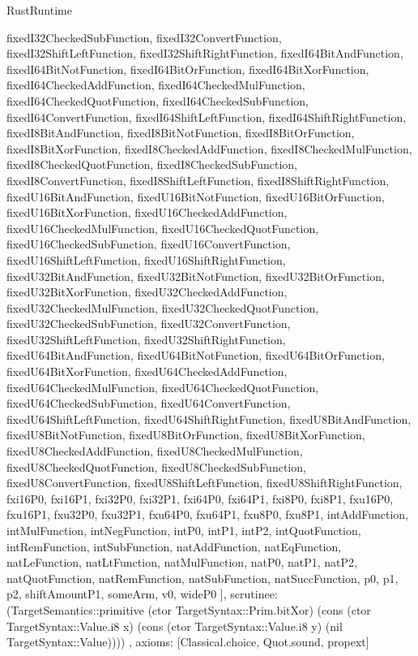 \begin{lexlean}{RustRuntime}
\begin{semanticmodule}
{{      fixedI32CheckedSubFunction,
      fixedI32ConvertFunction,
      fixedI32ShiftLeftFunction,
      fixedI32ShiftRightFunction,
      fixedI64BitAndFunction,
      fixedI64BitNotFunction,
      fixedI64BitOrFunction,
      fixedI64BitXorFunction,
      fixedI64CheckedAddFunction,
      fixedI64CheckedMulFunction,
      fixedI64CheckedQuotFunction,
      fixedI64CheckedSubFunction,
      fixedI64ConvertFunction,
      fixedI64ShiftLeftFunction,
      fixedI64ShiftRightFunction,
      fixedI8BitAndFunction,
      fixedI8BitNotFunction,
      fixedI8BitOrFunction,
      fixedI8BitXorFunction,
      fixedI8CheckedAddFunction,
      fixedI8CheckedMulFunction,
      fixedI8CheckedQuotFunction,
      fixedI8CheckedSubFunction,
      fixedI8ConvertFunction,
      fixedI8ShiftLeftFunction,
      fixedI8ShiftRightFunction,
      fixedU16BitAndFunction,
      fixedU16BitNotFunction,
      fixedU16BitOrFunction,
      fixedU16BitXorFunction,
      fixedU16CheckedAddFunction,
      fixedU16CheckedMulFunction,
      fixedU16CheckedQuotFunction,
      fixedU16CheckedSubFunction,
      fixedU16ConvertFunction,
      fixedU16ShiftLeftFunction,
      fixedU16ShiftRightFunction,
      fixedU32BitAndFunction,
      fixedU32BitNotFunction,
      fixedU32BitOrFunction,
      fixedU32BitXorFunction,
      fixedU32CheckedAddFunction,
      fixedU32CheckedMulFunction,
      fixedU32CheckedQuotFunction,
      fixedU32CheckedSubFunction,
      fixedU32ConvertFunction,
      fixedU32ShiftLeftFunction,
      fixedU32ShiftRightFunction,
      fixedU64BitAndFunction,
      fixedU64BitNotFunction,
      fixedU64BitOrFunction,
      fixedU64BitXorFunction,
      fixedU64CheckedAddFunction,
      fixedU64CheckedMulFunction,
      fixedU64CheckedQuotFunction,
      fixedU64CheckedSubFunction,
      fixedU64ConvertFunction,
      fixedU64ShiftLeftFunction,
      fixedU64ShiftRightFunction,
      fixedU8BitAndFunction,
      fixedU8BitNotFunction,
      fixedU8BitOrFunction,
      fixedU8BitXorFunction,
      fixedU8CheckedAddFunction,
      fixedU8CheckedMulFunction,
      fixedU8CheckedQuotFunction,
      fixedU8CheckedSubFunction,
      fixedU8ConvertFunction,
      fixedU8ShiftLeftFunction,
      fixedU8ShiftRightFunction,
      fxi16P0,
      fxi16P1,
      fxi32P0,
      fxi32P1,
      fxi64P0,
      fxi64P1,
      fxi8P0,
      fxi8P1,
      fxu16P0,
      fxu16P1,
      fxu32P0,
      fxu32P1,
      fxu64P0,
      fxu64P1,
      fxu8P0,
      fxu8P1,
      intAddFunction,
      intMulFunction,
      intNegFunction,
      intP0,
      intP1,
      intP2,
      intQuotFunction,
      intRemFunction,
      intSubFunction,
      natAddFunction,
      natEqFunction,
      natLeFunction,
      natLtFunction,
      natMulFunction,
      natP0,
      natP1,
      natP2,
      natQuotFunction,
      natRemFunction,
      natSubFunction,
      natSuccFunction,
      p0,
      p1,
      p2,
      shiftAmountP1,
      someArm,
      v0,
      wideP0
    ],
    scrutinee: (TargetSemantics::primitive (ctor TargetSyntax::Prim.bitXor) (cons (ctor TargetSyntax::Value.i8 x) (cons (ctor TargetSyntax::Value.i8 y) (nil TargetSyntax::Value))))
  },
  axioms: [Classical.choice, Quot.sound, propext]
}


\end{semanticmodule}
\end{lexlean}
